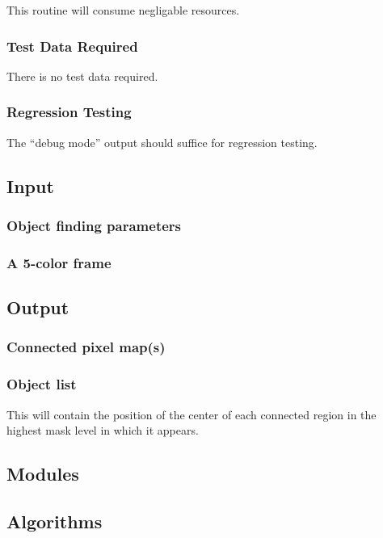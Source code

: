   This routine will consume negligable resources.

\subsubsection {Test Data Required}

  There is no test data required.

\subsubsection {Regression Testing}

  The ``debug mode'' output should suffice for regression testing.

\subsection{Input}

\subsubsection{Object finding parameters}
\subsubsection{A 5-color frame}

\subsection{Output}

\subsubsection{Connected pixel map(s)}
\subsubsection{Object list}
This will contain the position of the center of each connected region
in the highest mask level in which it appears.

\subsection{Modules}

\subsection{Algorithms}

